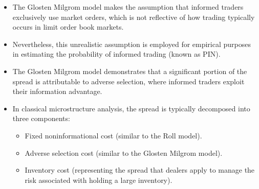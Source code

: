 \begin{itemize}
	\item The Glosten Milgrom model makes the assumption that informed traders exclusively use market orders, which is not reflective of how trading typically occurs in limit order book markets.
	\item Nevertheless, this unrealistic assumption is employed for empirical purposes in estimating the probability of informed trading (known as PIN).
	\item The Glosten Milgrom model demonstrates that a significant portion of the spread is attributable to adverse selection, where informed traders exploit their information advantage.
	\item In classical microstructure analysis, the spread is typically decomposed into three components:
	\begin{itemize}
		\item Fixed noninformational cost (similar to the Roll model).
		\item Adverse selection cost (similar to the Glosten Milgrom model).
		\item Inventory cost (representing the spread that dealers apply to manage the risk associated with holding a large inventory).
	\end{itemize}	
\end{itemize}

